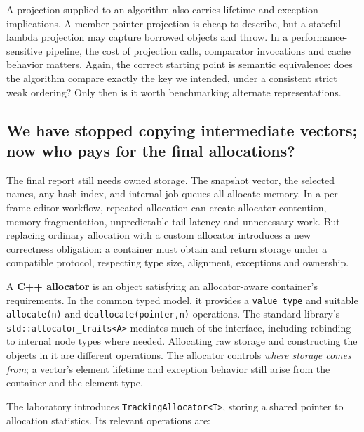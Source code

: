 A projection supplied to an algorithm also carries lifetime and exception implications. A member-pointer projection is cheap to describe, but a stateful lambda projection may capture borrowed objects and throw. In a performance-sensitive pipeline, the cost of projection calls, comparator invocations and cache behavior matters. Again, the correct starting point is semantic equivalence: does the algorithm compare exactly the key we intended, under a consistent strict weak ordering? Only then is it worth benchmarking alternate representations.

\subsection{We have stopped copying intermediate vectors; now who pays for the final allocations?}\label{01-foundations-i-ch006-we-have-stopped-copying-intermediate-vectors-now-who-pays-for-the-final-allocations}

The final report still needs owned storage. The snapshot vector, the selected names, any hash index, and internal job queues all allocate memory. In a per-frame editor workflow, repeated allocation can create allocator contention, memory fragmentation, unpredictable tail latency and unnecessary work. But replacing ordinary allocation with a custom allocator introduces a new correctness obligation: a container must obtain and return storage under a compatible protocol, respecting type size, alignment, exceptions and ownership.

A \textbf{C++ allocator} is an object satisfying an allocator-aware container's requirements. In the common typed model, it provides a \texttt{value\_type} and suitable \texttt{allocate(n)} and \texttt{deallocate(pointer,n)} operations. The standard library's \texttt{std::allocator\_traits\textless{}A\textgreater{}} mediates much of the interface, including rebinding to internal node types where needed. Allocating raw storage and constructing the objects in it are different operations. The allocator controls \emph{where storage comes from}; a vector's element lifetime and exception behavior still arise from the container and the element type.

The laboratory introduces \texttt{TrackingAllocator\textless{}T\textgreater{}}, storing a shared pointer to allocation statistics. Its relevant operations are:

